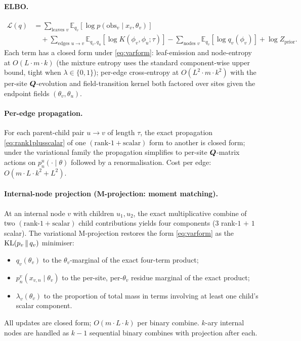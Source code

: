 \paragraph{ELBO.}
\begin{align}
  \mathcal{L}(q) &= \!\sum_{\text{leaves } v}\!\mathbb{E}_{q_v}[\log p(\text{obs}_v\!\mid\!x_v,\theta_v)]
                    \nonumber \\
                 &\quad + \!\sum_{\text{edges } u\to v}\!\mathbb{E}_{q_v,q_u}[\log K(\phi_v,\phi_u;\tau)]
                    - \!\sum_{\text{nodes } v}\!\mathbb{E}_{q_v}[\log q_v(\phi_v)]
                    + \log Z_{\text{prior}}.
  \label{eq:elbo}
\end{align}
Each term has a closed form under \eqref{eq:varform}: leaf-emission
and node-entropy at $O(L\cdot m\cdot k)$ (the mixture entropy uses
the standard component-wise upper bound, tight when $\lambda\in\{0,1\}$);
per-edge cross-entropy at $O(L^2\cdot m\cdot k^2)$ with the per-site
$\bm{Q}$-evolution and field-transition kernel both factored over sites
given the endpoint fields $(\theta_v,\theta_u)$.

\paragraph{Per-edge propagation.} For each parent-child pair
$u\to v$ of length $\tau$, the exact propagation
\eqref{eq:rank1plusscalar} of one $(\text{rank-}1+\text{scalar})$
form to another is closed form; under the variational family the
propagation simplifies to per-site $\bm{Q}$-matrix actions on
$p_n^u(\cdot\!\mid\theta)$ followed by a renormalisation. Cost per
edge: $O(m\cdot L\cdot k^2 + L^2)$.

\paragraph{Internal-node projection (M-projection: moment matching).}
At an internal node $v$ with children $u_1,u_2$, the exact
multiplicative combine of two $(\text{rank-}1+\text{scalar})$ child
contributions yields four components ($3$ rank-$1$ $+$ $1$ scalar).
The variational M-projection restores the form \eqref{eq:varform}
as the $\mathrm{KL}(p_v\,\|\,q_v)$ minimiser:
\begin{itemize}\itemsep0pt
  \item $q_v(\theta_v)$ to the $\theta_v$-marginal of the exact
        four-term product;
  \item $p_n^v(x_{v,n}\!\mid\theta_v)$ to the per-site, per-$\theta_v$
        residue marginal of the exact product;
  \item $\lambda_v(\theta_v)$ to the proportion of total mass in
        terms involving at least one child's scalar component.
\end{itemize}
All updates are closed form; $O(m\cdot L\cdot k)$ per binary combine.
$k$-ary internal nodes are handled as $k-1$ sequential binary
combines with projection after each.


